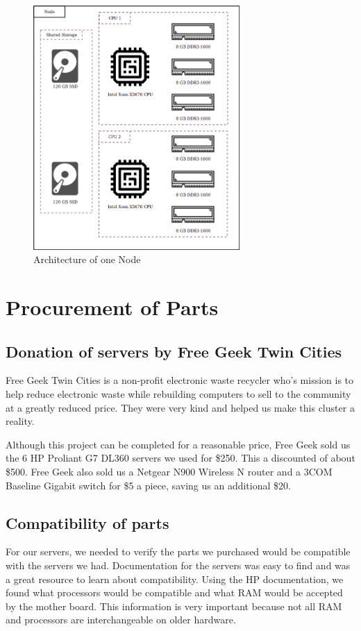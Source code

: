 \documentclass[12pt]{article}
\begin{document}
\begin{figure} [H]
    \centering
    \includegraphics[width=0.7\textwidth, height=0.5\textheight]{CPUArch.png}
    \caption{Architecture of one Node}
    \label{fig:cpuarc}
\end{figure}

%
%
\section{Procurement of Parts}

\subsection{Donation of servers by Free Geek Twin Cities}
Free Geek Twin Cities is a non-profit electronic waste recycler who's mission is to help reduce electronic waste while rebuilding computers to sell to the community at a greatly reduced price. They were very kind and helped us make this cluster a reality.

Although this project can be completed for a reasonable price, Free Geek sold us the 6 HP Proliant G7 DL360 servers we used for \$250. This a discounted of about \$500. Free Geek also sold us a Netgear N900 Wireless N router and a 3COM Baseline Gigabit switch for \$5 a piece, saving us an additional \$20.

\subsection{Compatibility of parts}
For our servers, we needed to verify the parts we purchased would be compatible with the servers we had. Documentation \cite{HP} for the servers was easy to find and was a great resource to learn about compatibility. Using the HP documentation, we found what processors would be compatible and what RAM would be accepted by the mother board. This information is very important because not all RAM and processors are interchangeable on older hardware.
\end{document}
